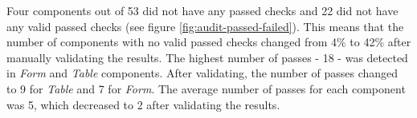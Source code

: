 \documentclass{master_thesis}
\begin{document}

Four components out of 53 did not have any passed checks and 22 did not have any valid passed checks (see figure \ref{fig:audit-passed-failed}). This means that the number of components with no valid passed checks changed from 4\%  to 42\% after manually validating the results. The highest number of passes - 18 - was detected in \textit{Form} and \textit{Table} components. After validating, the number of passes changed to 9 for \textit{Table} and 7 for \textit{Form}. The average number of passes for each component was 5, which decreased to 2 after validating the results.
\end{document}
